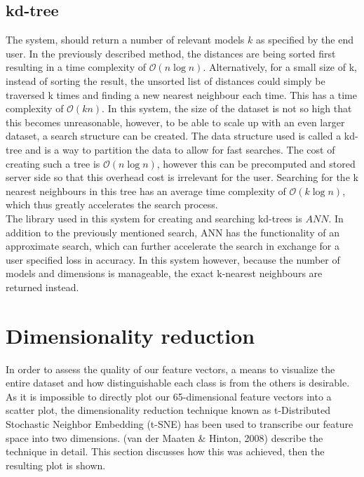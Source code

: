 \documentclass{bigdata}
\begin{document}
\subsection{kd-tree}
The system, should return a number of relevant models $k$ as specified by the end user. In the previously described method, the distances are being sorted first resulting in a time complexity of $\mathcal{O}(n\log{}n)$. Alternatively, for a small size of k, instead of sorting the result, the unsorted list of distances could simply be traversed k times and finding a new nearest neighbour each time. This has a time complexity of $\mathcal{O}(kn)$. In this system, the size of the dataset is not so high that this becomes unreasonable, however, to be able to scale up with an even larger dataset, a search structure can be created. The data structure used is called a kd-tree and is a way to partition the data to allow for fast searches. The cost of creating such a tree is $\mathcal{O}(n\log{}n)$, however this can be precomputed and stored server side so that this overhead cost is irrelevant for the user. Searching for the k nearest neighbours in this tree has an average time complexity of $\mathcal{O}(k\log{}n)$, which thus greatly accelerates the search process. \\
The library used in this system for creating and searching kd-trees is $ANN$. In addition to the previously mentioned search, ANN has the functionality of an approximate search, which can further accelerate the search in exchange for a user specified loss in accuracy. In this system however, because the number of models and dimensions is manageable, the exact k-nearest neighbours are returned instead. 

\section{Dimensionality reduction}
In order to assess the quality of our feature vectors, a means to visualize the entire dataset and how distinguishable each class is from the others is desirable. As it is impossible to directly plot our 65-dimensional feature vectors into a scatter plot, the dimensionality reduction technique known as t-Distributed Stochastic Neighbor Embedding (t-SNE) has been used to transcribe our feature space into two dimensions. (van der Maaten \& Hinton, 2008) describe the technique in detail. This section discusses how this was achieved, then the resulting plot is shown. 
\end{document}
